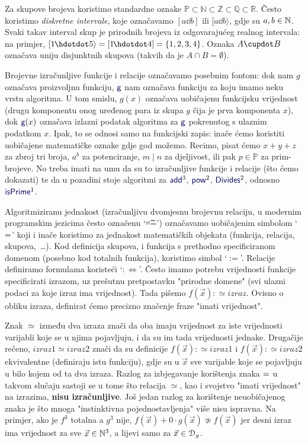 Za skupove brojeva koristimo standardne oznake $\mathbb P\subset \mathbb N\subset \mathbb Z\subset \mathbb Q\subset \mathbb R$. Često koristimo \emph{diskretne intervale}, koje označavamo $[a\dd b]$ ili $[a\dd b\rangle$, gdje su $a,b\in{\mathbb N}$. Svaki takav interval skup je prirodnih brojeva iz odgovarajućeg realnog intervala: na primjer, $[1\mspace{-1mu}\dd 5\rangle=[1\mspace{-2mu}\dd 4]=\{1,2,3,4\}$. Oznaka $A\dcup B$ označava uniju disjunktnih skupova (takvih da je $A\cap B=\emptyset$).

Brojevne izračunljive funkcije i relacije označavamo posebnim fontom: dok nam $g$ označava proizvoljnu funkciju, $\f{g}$ nam označava funkciju za koju imamo neku vrstu algoritma. U tom smislu, $g(x)$ označava uobičajenu funkcijsku vrijednost (drugu komponentu onog uređenog para iz skupa $g$ čija je prva komponenta $x$), dok $\f{g}(x)$ označava izlazni podatak algoritma za $\f{g}$ pokrenutog s ulaznim podatkom $x$. Ipak, to se odnosi samo na funkcijski zapis: inače ćemo koristiti uobičajene matematičke oznake gdje god možemo. Recimo, pisat ćemo $x+y+z$ za zbroj tri broja, $a^b$ za potenciranje, $m\mid n$ za djeljivost, ili pak $p\in\mathbb P$ za prim-brojeve. No treba imati na umu da su to izračunljive funkcije i relacije (što ćemo dokazati) te da u pozadini stoje algoritmi za $\f{add}^3$, $\f{pow}^2$, $\f{Divides}^2$, odnosno $\f{isPrime}^1$.

\begin{napomena}[{name=[jednakost i parcijalna jednakost]}]\label{nap:parcdef}
    Algoritmiziranu jednakost (izračunljivu dvomjesnu brojevnu relaciju, u modernim programskim jezicima često označenu \enquote*{\t{==}}) oz\-na\-ča\-va\-mo uobičajenim simbolom \enquote*{$=$} koji i inače koristimo za jednakost matematičkih objekata (funkcija, relacija, skupova,~\ldots). Kod definicija skupova, i funkcija s prethodno specificiranom domenom (posebno kod totalnih funkcija), koristimo simbol \enquote*{$:=$}. Relacije definiramo formulama koristeći \enquote*{$:\Longleftrightarrow$}. Često imamo potrebu vrijednosti funkcije specificirati izrazom, uz prešutnu pretpostavku "prirodne domene" (svi ulazni podaci za koje izraz ima vrijednost). Tada pišemo $f(\vec x):\simeq izraz$. Ovisno o obliku izraza, definirat ćemo precizno značenje fraze "imati vrijednost".
\end{napomena}

Znak $\simeq$ između dva izraza znači da oba imaju vrijednost za iste vrijednosti varijabli koje se u njima pojavljuju, i da su im tada vrijednosti jednake. Drugačije rečeno, $izraz1\simeq izraz2$ znači da su definicije $f(\vec x):\simeq izraz1$ i $f(\vec x):\simeq izraz2$ ekvivalentne (definiraju istu funkciju), gdje su u $\vec x$ sve varijable koje se pojavljuju u bilo kojem od ta dva izraza. Razlog za izbjegavanje korištenja znaka $=$ u takvom slučaju sastoji se u tome što relacija $\simeq$, kao i svojstvo "imati vrijednost" na izrazima, \textbf{nisu izračunljive}. Još jedan razlog za korištenje neuobičajenog znaka je što mnoga "instinktivna pojednostavljenja" više nisu ispravna. Na primjer, ako je $f^3$ totalna a $g^3$ nije, $f(\vec x)+0\cdot g(\vec x)\nsimeq f(\vec x)$ jer desni izraz ima vrijednost za sve $\vec x\in{\mathbb N}^3$, a lijevi samo za $\vec x\in\mathcal D_{g}$.

